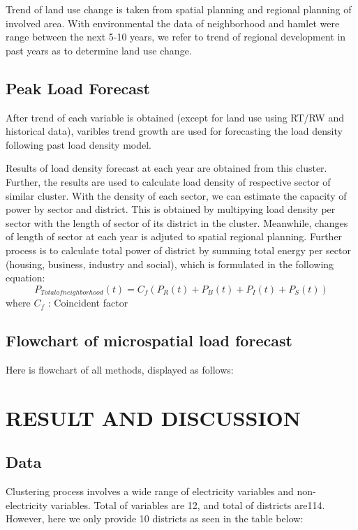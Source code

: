 \documentclass[conference]{IEEEtran}
\begin{document}
{Trend of land use change is taken from spatial planning and regional planning of involved area. With environmental the data of neighborhood and hamlet were range between the next 5-10 years, we refer to trend of regional development in past years as to determine land use change.
\subsection{Peak Load Forecast}
After trend of each variable is obtained (except for land use using RT/RW and historical data), varibles trend growth are used for forecasting the load density following past load density model.

Results of load density forecast at each year are obtained from this cluster. Further, the results are used to calculate load density of respective sector of similar cluster. With the density of each sector, we can estimate the capacity of power by sector and district. This is obtained by multipying load density per sector with the length of sector of its district in the cluster. Meanwhile,  changes of length of sector at each year is adjuted to spatial regional planning. Further process is to calculate total power of district by summing total energy per sector (housing, business, industry and social), which is formulated in the following equation: 
\begin{equation}\label{eq:10}
    P_{Totalofneighborhood}(t)=C_{f}(P_{R}(t)+P_{B}(t)+P_I(t)+P_S(t))
\end{equation}
where  $C_{f}$ : Coincident  factor 
\subsection{Flowchart of microspatial load forecast }
Here is flowchart of all methods, displayed as follows:
    
\section{RESULT AND DISCUSSION}
\subsection{Data}
Clustering process involves a wide range of electricity variables and non-electricity variables. Total of variables are 12, and total of districts are114. However, here we only provide 10 districts as seen in the table below:
    
}
\end{document}
